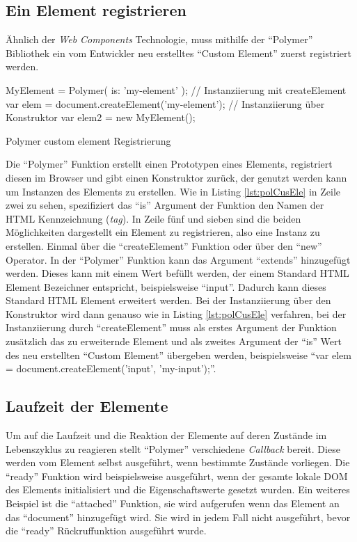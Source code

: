 \documentclass[12pt, paper=a4, bibtotoc, toc=listof, headsepline=true, numbers=endperiod]{scrreprt}
\begin{document}
		\subsection{Ein Element registrieren}
		Ähnlich der \emph{Web Components} Technologie, muss mithilfe der \enquote{Polymer} Bibliothek ein vom Entwickler neu erstelltes \enquote{Custom Element} zuerst registriert werden. 
		\begin{listing}
		\begin{JavaScriptcode*}{}
	MyElement = Polymer({
	   is: 'my-element'
	});
	// Instanziierung mit createElement
	var elem = document.createElement('my-element');
	// Instanziierung über Konstruktor
	var elem2 = new MyElement();
		\end{JavaScriptcode*}
		\caption{Polymer custom element Registrierung}
		\label{lst:polCusEle}
		\end{listing}
Die \enquote{Polymer} Funktion erstellt einen Prototypen eines Elements, registriert diesen im Browser und gibt einen Konstruktor zurück, der genutzt werden kann um Instanzen des Elements zu erstellen. Wie in Listing \ref{lst:polCusEle} in Zeile zwei zu sehen, spezifiziert das \enquote{is} Argument der Funktion den Namen der \ac{HTML} Kennzeichnung (\emph{tag}). In Zeile fünf und sieben sind die beiden Möglichkeiten dargestellt ein Element zu registrieren, also eine Instanz zu erstellen. Einmal über die \enquote{createElement} Funktion oder über den \enquote{new} Operator. In der \enquote{Polymer} Funktion kann das Argument \enquote{extends} hinzugefügt werden. Dieses kann mit einem Wert befüllt werden, der einem Standard \ac{HTML} Element Bezeichner entspricht, beispielsweise \enquote{input}. Dadurch kann dieses Standard \ac{HTML} Element erweitert werden. Bei der Instanziierung über den Konstruktor wird dann genauso wie in Listing \ref{lst:polCusEle} verfahren, bei der Instanziierung durch \enquote{createElement} muss als erstes Argument der Funktion zusätzlich das zu erweiternde Element und als zweites Argument der \enquote{is} Wert des neu erstellten \enquote{Custom Element} übergeben werden, beispielsweise \enquote{var elem = document.createElement('input', 'my-input');}\cite{polyReg}.
\subsection{Laufzeit der Elemente}
\label{sec:polLau}
Um auf die Laufzeit und die Reaktion der Elemente auf deren Zustände im Lebenszyklus zu reagieren stellt \enquote{Polymer} verschiedene \emph{Callback} bereit. Diese werden vom Element selbst ausgeführt, wenn bestimmte Zustände vorliegen. Die \enquote{ready} Funktion wird beispielsweise ausgeführt, wenn der gesamte lokale \ac{DOM} des Elements initialisiert und die Eigenschaftswerte gesetzt wurden. Ein weiteres Beispiel ist die \enquote{attached} Funktion, sie wird aufgerufen wenn das Element an das \enquote{document} hinzugefügt wird. Sie wird in jedem Fall nicht ausgeführt, bevor die \enquote{ready} Rückruffunktion ausgeführt wurde\cite{polyReg}.
\end{document}
